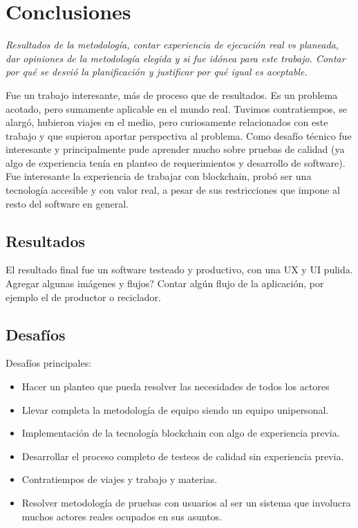 \chapter[Conclusiones]{Conclusiones}
\label{cp:conclusions}


\parindent0pt

\textit{Resultados de la metodología, contar experiencia de ejecución real vs planeada, dar opiniones de la metodología elegida y si fue idónea para este trabajo. Contar por qué se desvió la planificación y justificar por qué igual es aceptable.}

Fue un trabajo interesante, más de proceso que de resultados. Es un problema acotado, pero sumamente aplicable en el mundo real. Tuvimos contratiempos, se alargó, hubieron viajes en el medio, pero curiosamente relacionados con este trabajo y que supieron aportar perspectiva al problema. Como desafío técnico fue interesante y principalmente pude aprender mucho sobre pruebas de calidad (ya algo de experiencia tenía en planteo de requerimientos y desarrollo de software). Fue interesante la experiencia de trabajar con blockchain, probó ser una tecnología accesible y con valor real, a pesar de sus restricciones que impone al resto del software en general.

\section{Resultados}

El resultado final fue un software testeado y productivo, con una UX y UI pulida. Agregar algunas imágenes y flujos?
Contar algún flujo de la aplicación, por ejemplo el de productor o reciclador.

\section{Desafíos}

Desafíos principales:
\begin{itemize}
	\item Hacer un planteo que pueda resolver las necesidades de todos los actores
	\item Llevar completa la metodología de equipo siendo un equipo unipersonal.
	\item Implementación de la tecnología blockchain con algo de experiencia previa.
	\item Desarrollar el proceso completo de testeos de calidad sin experiencia previa.
	\item Contratiempos de viajes y trabajo y materias.
	\item Resolver metodología de pruebas con usuarios al ser un sistema que involucra muchos actores reales ocupados en sus asuntos.
\end{itemize}

